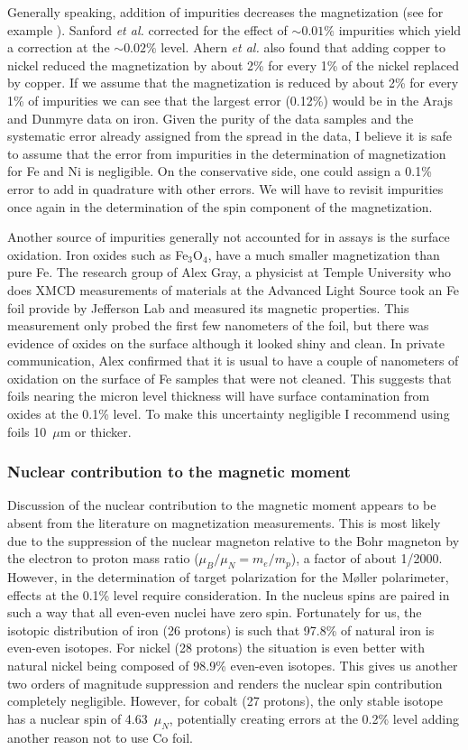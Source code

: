 \documentclass[12pt]{article}
\begin{document}
Generally speaking, addition of impurities decreases the magnetization (see for example \cite{Luborsky1980, Ahern1958, Sanford1941}). Sanford {\it et al.} corrected for the effect of $\sim0.01\%$ impurities which yield a correction at the $\sim0.02\%$ level\cite{Sanford1941}. Ahern {\it et al.} also found that adding copper to nickel reduced the magnetization by about 2\% for every 1\% of the nickel replaced by copper. If we assume that the magnetization is reduced by about 2\% for every 1\% of impurities we can see that the largest error (0.12\%) would be in the Arajs and Dunmyre data on iron. Given the purity of the data samples and the systematic error already assigned from the spread in the data, I believe it is safe to assume that the error from impurities in the determination of magnetization for Fe and Ni is negligible. On the conservative side, one could assign a 0.1\% error to add in quadrature with other errors. We will have to revisit impurities once again in the determination of the spin component of the magnetization.

Another source of impurities generally not accounted for in assays is the surface oxidation. Iron oxides such as Fe$_3$O$_4$, have a much smaller magnetization than pure Fe. The research group of Alex Gray, a physicist at Temple University who does XMCD measurements of materials at the Advanced Light Source took an Fe foil provide by Jefferson Lab and measured its magnetic properties. This measurement only probed the first few nanometers of the foil, but there was evidence of oxides on the surface although it looked shiny and clean. In private communication, Alex confirmed that it is usual to have a couple of nanometers of oxidation on the surface of Fe samples that were not cleaned. This suggests that foils nearing the micron level thickness will have surface contamination from oxides at the 0.1\% level. To make this uncertainty negligible I recommend using foils 10~$\mu$m or thicker.

\subsubsection{Nuclear contribution to the magnetic moment}
Discussion of the nuclear contribution to the magnetic moment appears to be absent from the literature on magnetization measurements. This is most likely due to the suppression of the nuclear magneton relative to the Bohr magneton by the electron to proton mass ratio ($\mu_B/\mu_N=m_e/m_p$), a factor of about 1/2000. However, in the determination of target polarization for the M\o ller polarimeter, effects at the 0.1\% level require consideration. In the nucleus spins are paired in such a way that all even-even nuclei have zero spin. Fortunately for us, the isotopic distribution of iron (26 protons) is such that 97.8\% of natural iron is even-even isotopes. For nickel (28 protons) the situation is even better with natural nickel being composed of 98.9\% even-even isotopes. This gives us another two orders of magnitude suppression and renders the nuclear spin contribution completely negligible. However, for cobalt (27 protons), the only stable isotope has a nuclear spin of 4.63~$\mu_N$, potentially creating errors at the 0.2\% level adding another reason not to use Co foil.   
\end{document}
